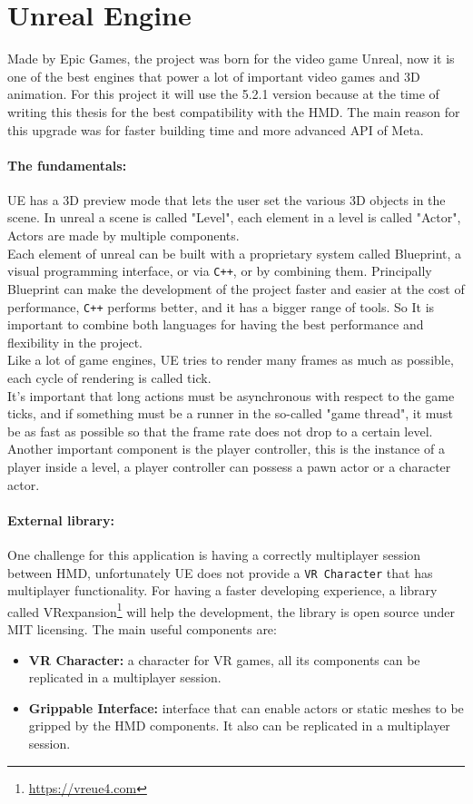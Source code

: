 \section{Unreal Engine}
\noindent
Made by Epic Games, the project was born for the video game Unreal,
now it is one of the best engines that power a lot of important video games and 3D animation. 
For this project it will use the 5.2.1 version because at the time of writing this thesis for the best compatibility with the \ac{HMD}. 
The main reason for this upgrade was for faster building time and more advanced \ac{API} of Meta. 

\paragraph{The fundamentals:}
\ac{UE} has a 3D preview mode that lets the user set the various 3D objects in the scene.
In unreal a scene is called "Level", each element in a level is called "Actor", Actors are made by multiple components.\\
Each element of unreal can be built with a proprietary system called Blueprint, a visual programming interface, or via \texttt{C++}, or by combining them.
Principally Blueprint can make the development of the project faster and easier at the cost of performance, \texttt{C++} performs better, and it has a bigger range of tools.
So It is important to combine both languages for having the best performance and flexibility in the project.\\
Like a lot of game engines, \ac{UE} tries to render many frames as much as possible, each cycle of rendering is called tick.\\
It's important that long actions must be asynchronous with respect to the game ticks, and if something must be a runner in the so-called "game thread", it must be as fast as possible so that the frame rate does not drop to a certain level.\\
Another important component is the player controller, this is the instance of a player inside a level, a player controller can possess a pawn actor or a character actor.


\paragraph{External library:}
One challenge for this application is having a correctly multiplayer session between \ac{HMD}, unfortunately \ac{UE} does not provide a \texttt{VR Character} that has multiplayer functionality.
For having a faster developing experience, a library called VRexpansion\footnote{\url{https://vreue4.com}} will help the development, the library is open source under MIT licensing.
The main useful components are:
\begin{itemize}
  \item \textbf{VR Character:} a character for \ac{VR} games, all its components can be replicated in a multiplayer session.
  \item \textbf{Grippable Interface:}  interface that can enable actors or static meshes to be gripped by the \ac{HMD} components. It also can be replicated in a multiplayer session.
\end{itemize}

